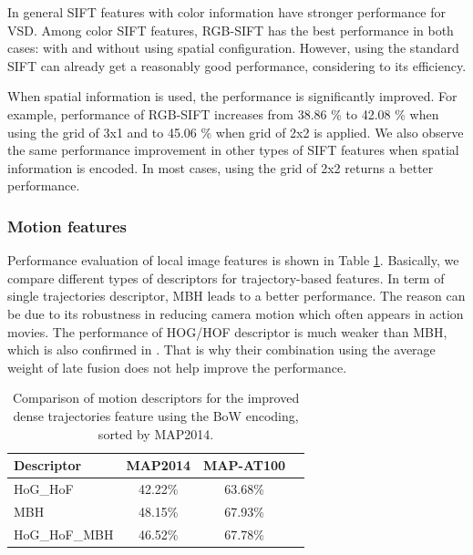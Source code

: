 \documentclass[twocolumn]{bmcart}%
\begin{document}
In general SIFT features with color information have stronger performance for VSD. Among color SIFT features, RGB-SIFT has the best performance in both cases: with and without using spatial configuration. However, using the standard SIFT can already get a reasonably good performance, considering to its efficiency. 

When spatial information is used, the performance is significantly improved. For example, performance of RGB-SIFT increases from 38.86 \%  to 42.08 \% when using the grid of 3x1 and to 45.06 \% when grid of 2x2 is applied. We also observe the same performance improvement in other types of SIFT features when spatial information is encoded. In most cases, using the grid of 2x2 returns a better performance. 

\subsubsection{Motion features}
Performance evaluation of local image features is shown in Table \ref{tab:motion_bow}. Basically, we compare different types of descriptors for trajectory-based features. In term of single trajectories descriptor, MBH leads to a better performance. The reason can be due to its robustness in reducing camera motion which often appears in action movies. The performance of HOG/HOF descriptor is much weaker than MBH, which is also confirmed in \cite{wang2013action}. That is why their combination using the average weight of late fusion does not help improve the performance.
\begin{table}
	\centering
	\caption{Comparison of motion descriptors for the improved dense trajectories feature using the BoW encoding, sorted by MAP2014.}
	\begin{tabular}{lccc}
		\hline
		Descriptor & MAP2014 & MAP-AT100 \\ \hline
		HoG\_HoF & 42.22\% & 63.68\% \\ 
		MBH   & 48.15\% & 67.93\% \\
		HoG\_HoF\_MBH & 46.52\% & 67.78\% \\ \hline
	\end{tabular}%
	\label{tab:motion_bow}%
\end{table}%
\end{document}
